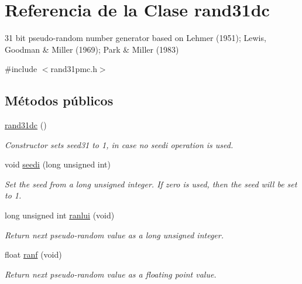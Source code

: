 \hypertarget{classrand31dc}{\section{Referencia de la Clase rand31dc}
\label{classrand31dc}
}


31 bit pseudo-\/random number generator based on Lehmer (1951); Lewis, Goodman \& Miller (1969); Park \& Miller (1983)  




{\ttfamily \#include $<$rand31pmc.\+h$>$}

\subsection*{Métodos públicos}
\begin{DoxyCompactItemize}
\item 
\hypertarget{classrand31dc_ab57e4bf816dd2d20c052fd951338d845}{\hyperlink{classrand31dc_ab57e4bf816dd2d20c052fd951338d845}{rand31dc} ()}\label{classrand31dc_ab57e4bf816dd2d20c052fd951338d845}

\begin{DoxyCompactList}\small\item\em Constructor sets seed31 to 1, in case no seedi operation is used. \end{DoxyCompactList}\item 
\hypertarget{classrand31dc_a8890a8223643fff52fff7a332e2053c6}{void \hyperlink{classrand31dc_a8890a8223643fff52fff7a332e2053c6}{seedi} (long unsigned int)}\label{classrand31dc_a8890a8223643fff52fff7a332e2053c6}

\begin{DoxyCompactList}\small\item\em Set the seed from a long unsigned integer. If zero is used, then the seed will be set to 1. \end{DoxyCompactList}\item 
\hypertarget{classrand31dc_a6694db8a614a793f4a00473f8b7ea409}{long unsigned int \hyperlink{classrand31dc_a6694db8a614a793f4a00473f8b7ea409}{ranlui} (void)}\label{classrand31dc_a6694db8a614a793f4a00473f8b7ea409}

\begin{DoxyCompactList}\small\item\em Return next pseudo-\/random value as a long unsigned integer. \end{DoxyCompactList}\item 
\hypertarget{classrand31dc_ae3fd0aa4320143ee001e408587bb7844}{float \hyperlink{classrand31dc_ae3fd0aa4320143ee001e408587bb7844}{ranf} (void)}\label{classrand31dc_ae3fd0aa4320143ee001e408587bb7844}

\begin{DoxyCompactList}\small\item\em Return next pseudo-\/random value as a floating point value. \end{DoxyCompactList}\end{DoxyCompactItemize}


